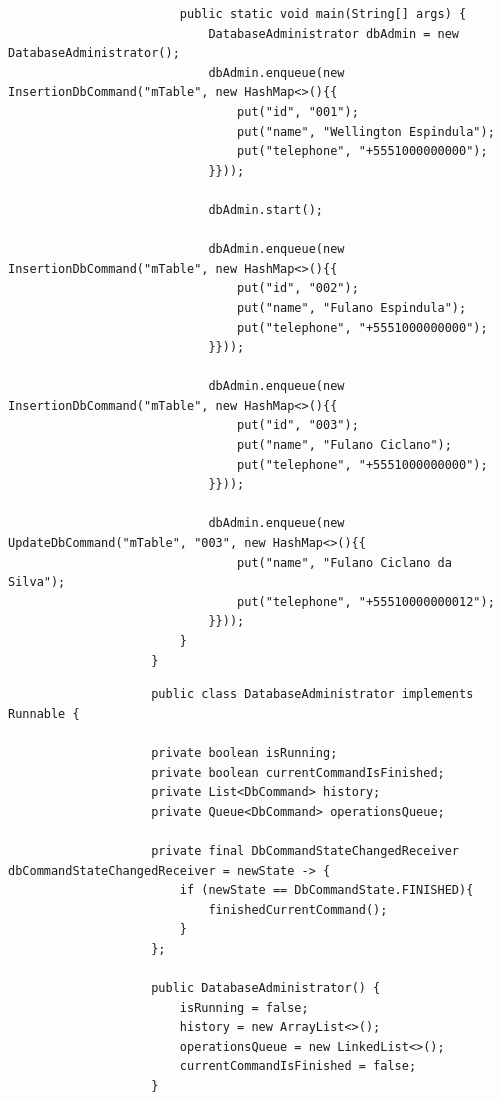 \documentclass[12pt, a4paper]{article}
\begin{document}
\begin{enumerate}[label=\textbf{\arabic*.}]
\begin{lstlisting}
                        public static void main(String[] args) {
                    	    DatabaseAdministrator dbAdmin = new DatabaseAdministrator();
                    	    dbAdmin.enqueue(new InsertionDbCommand("mTable", new HashMap<>(){{
                    	        put("id", "001");
                    	        put("name", "Wellington Espindula");
                    	        put("telephone", "+5551000000000");
                            }}));
                    
                    	    dbAdmin.start();
                    
                    	    dbAdmin.enqueue(new InsertionDbCommand("mTable", new HashMap<>(){{
                    	        put("id", "002");
                    	        put("name", "Fulano Espindula");
                    	        put("telephone", "+5551000000000");
                            }}));
                    
                    	    dbAdmin.enqueue(new InsertionDbCommand("mTable", new HashMap<>(){{
                                put("id", "003");
                    	        put("name", "Fulano Ciclano");
                    	        put("telephone", "+5551000000000");
                            }}));
                    
                    	    dbAdmin.enqueue(new UpdateDbCommand("mTable", "003", new HashMap<>(){{
                    	        put("name", "Fulano Ciclano da Silva");
                    	        put("telephone", "+55510000000012");
                            }}));
                        }
                    }
        \end{lstlisting}
        \newpage
        \begin{lstlisting}
                    public class DatabaseAdministrator implements Runnable {
                
                    private boolean isRunning;
                    private boolean currentCommandIsFinished;
                    private List<DbCommand> history;
                    private Queue<DbCommand> operationsQueue;
                
                    private final DbCommandStateChangedReceiver dbCommandStateChangedReceiver = newState -> {
                        if (newState == DbCommandState.FINISHED){
                            finishedCurrentCommand();
                        }
                    };
                
                    public DatabaseAdministrator() {
                        isRunning = false;
                        history = new ArrayList<>();
                        operationsQueue = new LinkedList<>();
                        currentCommandIsFinished = false;
                    }
                

\end{lstlisting}
\end{enumerate}
\end{document}
